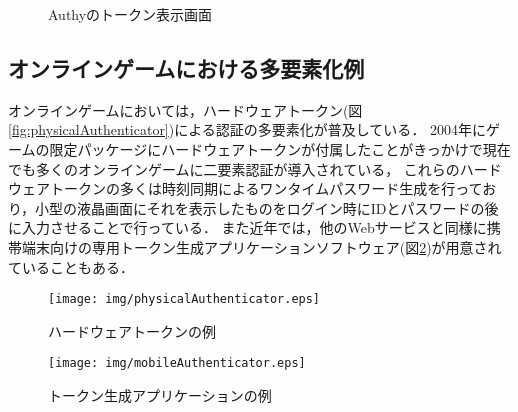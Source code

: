 \begin{figure}[ht]
\begin{center}
\end{center}
\caption{Authyのトークン表示画面}
\label{fig:authyiPhone}
\end{figure}

\subsection{オンラインゲームにおける多要素化例}
オンラインゲームにおいては，ハードウェアトークン(図\ref{fig:physicalAuthenticator})による認証の多要素化が普及している\cite{DBLP:journals/corr/CristofaroDFN13}．
2004年にゲームの限定パッケージにハードウェアトークンが付属した\cite{Yamane:2011:SOG:2021672.2021743}ことがきっかけで現在でも多くのオンラインゲームに二要素認証が導入されている，
これらのハードウェアトークンの多くは時刻同期によるワンタイムパスワード生成を行っており，小型の液晶画面にそれを表示したものをログイン時にIDとパスワードの後に入力させることで行っている．
また近年では，他のWebサービスと同様に携帯端末向けの専用トークン生成アプリケーションソフトウェア(図\ref{fig:mobileAuthenticator})が用意されていることもある．

\begin{figure}[ht]

\begin{minipage}{0.5\hsize}
\begin{center}
\texttt{[image: img/physicalAuthenticator.eps]}
\end{center}
\caption{ハードウェアトークンの例}
\label{fig:physicalAuthenticator}
\end{minipage}
\begin{minipage}{0.5\hsize}
\begin{center}
\texttt{[image: img/mobileAuthenticator.eps]}
\end{center}
\caption{トークン生成アプリケーションの例}
\label{fig:mobileAuthenticator}
\end{minipage}

\end{figure}


\newpage

